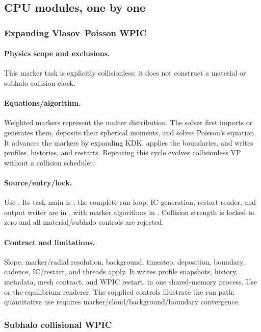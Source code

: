 \subsection{CPU modules, one by one}
\subsubsection{Expanding Vlasov--Poisson WPIC}
\paragraph{Physics scope and exclusions.}
This marker task is explicitly collisionless; it does not
construct a material or subhalo collision clock.
\paragraph{Equations/algorithm.}
Weighted markers represent the matter distribution. The solver first
imports or generates them, deposits their spherical moments, and solves
Poisson's equation. It advances the markers by expanding KDK, applies the
boundaries, and writes profiles, histories, and restarts. Repeating this cycle
evolves collisionless VP without a collision scheduler.
\paragraph{Source/entry/lock.}
Use .  Its task main is
; the complete run loop,
IC generation, restart reader, and output writer are in
, with marker algorithms in
.  Collision strength is locked
to zero and all material/subhalo controls are rejected.
\paragraph{Contract and limitations.}
Slope, marker/radial resolution, background, timestep, deposition, boundary,
cadence, IC/restart, and threads apply.  It writes profile snapshots, history,
metadata, mesh contract, and WPIC restart, in one shared-memory process.  Use
 or the equilibrium renderer.
The supplied controls illustrate the run path; quantitative use requires
marker/cloud/background/boundary convergence.

\subsubsection{Subhalo collisional WPIC}
